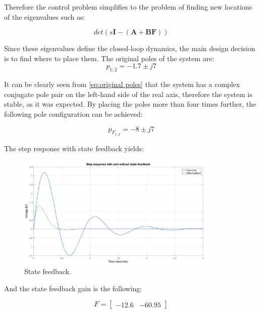 Therefore the control problem simplifies to the problem of finding new locations of the eigenvalues such as:

\begin{equation}
  \label{eq:distpoly}
    det(s\mathbf{I}-(\mathbf{A} + \mathbf{B} \mathbf{F}))
  \end{equation}

Since these eigenvalues define the closed-loop dynamics, the main design decision is to find where to place them. The original poles of the system are: 
\begin{equation}
  \label{eq:original poles}
  p_{1;2} = -1.7 \pm j7
  \end{equation}

It can be clearly seen from \eqref{eq:original poles} that the system has a complex conjugate pole pair on the left-hand side of the real axis, therefore the system is stable, as it was expected. By placing the poles more than four times further, the following pole configuration can be achieved: 

\begin{equation}
  \label{eq:desired_poles}
  p_{F_{1;2}} = -8 \pm j7
  \end{equation}
  
The step response with state feedback yields: 
\begin{figure}[H]
\centering
\includegraphics[width=0.85\textwidth]{rapport/billeder/statefeedback}
\caption{State feedback.}
\label{fig:statefeedback}
\end{figure}


And the state feedback gain is the following:

\begin{equation}
\label{eq:ss_dist2}
    F
=
 \begin{bmatrix}
    -12.6 & -60.95
\end{bmatrix}
\end{equation}